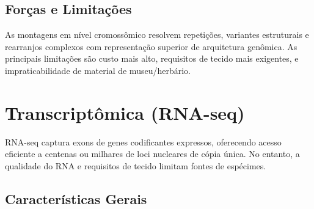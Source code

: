 \subsection{Forças e Limitações}

As montagens em nível cromossômico resolvem repetições, variantes estruturais e rearranjos complexos com representação superior de arquitetura genômica. As principais limitações são custo mais alto, requisitos de tecido mais exigentes, e impraticabilidade de material de museu/herbário.

\textcite{rhie2021, guiglielmoni2024, formenti2022}

\section{Transcriptômica (RNA-seq)}

RNA-seq captura exons de genes codificantes expressos, oferecendo acesso eficiente a centenas ou milhares de loci nucleares de cópia única. No entanto, a qualidade do RNA e requisitos de tecido limitam fontes de espécimes.

\subsection{Características Gerais}

